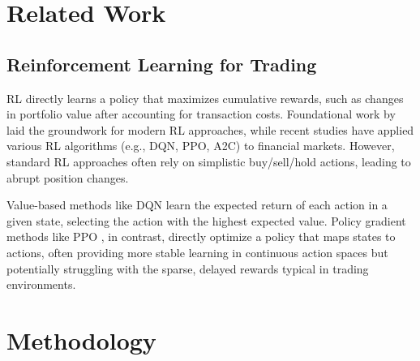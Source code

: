 \documentclass[11pt]{article}
\begin{document}
\section{Related Work}

\subsection{Reinforcement Learning for Trading}
RL directly learns a policy that maximizes cumulative rewards, such as changes in portfolio value after accounting for transaction costs. Foundational work by \citet{sutton_2018_irl} laid the groundwork for modern RL approaches, while recent studies have applied various RL algorithms (e.g., DQN, PPO, A2C) to financial markets. However, standard RL approaches often rely on simplistic buy/sell/hold actions, leading to abrupt position changes.

Value-based methods like DQN \citep{mnih2015human} learn the expected return of each action in a given state, selecting the action with the highest expected value. Policy gradient methods like PPO \citep{schulman2017proximal}, in contrast, directly optimize a policy that maps states to actions, often providing more stable learning in continuous action spaces but potentially struggling with the sparse, delayed rewards typical in trading environments.

\section{Methodology}
\end{document}
